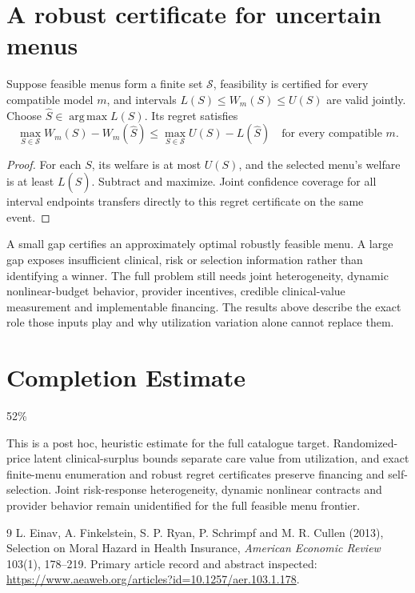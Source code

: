 \documentclass[11pt]{article}
\DeclareMathOperator*{\argmax}{arg\,max}
\begin{document}
\section*{A robust certificate for uncertain menus}
Suppose feasible menus form a finite set $\mathcal S$, feasibility is certified for every compatible model $m$, and intervals $L(S)\leq W_m(S)\leq U(S)$ are valid jointly. Choose $\widehat S\in\argmax L(S)$. Its regret satisfies
\[
 \max_{S\in\mathcal S}W_m(S)-W_m(\widehat S)
 \leq \max_{S\in\mathcal S}U(S)-L(\widehat S)
 \quad\text{for every compatible }m.
\]
\begin{proof}
For each $S$, its welfare is at most $U(S)$, and the selected menu's welfare is at least $L(\widehat S)$. Subtract and maximize. Joint confidence coverage for all interval endpoints transfers directly to this regret certificate on the same event.
\end{proof}

A small gap certifies an approximately optimal robustly feasible menu. A large gap exposes insufficient clinical, risk or selection information rather than identifying a winner. The full problem still needs joint heterogeneity, dynamic nonlinear-budget behavior, provider incentives, credible clinical-value measurement and implementable financing. The results above describe the exact role those inputs play and why utilization variation alone cannot replace them.

\section{Completion Estimate}
52\%

This is a post hoc, heuristic estimate for the full catalogue target.
Randomized-price latent clinical-surplus bounds separate care value from utilization, and exact finite-menu enumeration and robust regret certificates preserve financing and self-selection. Joint risk-response heterogeneity, dynamic nonlinear contracts and provider behavior remain unidentified for the full feasible menu frontier.

\begin{thebibliography}{9}
 L. Einav, A. Finkelstein, S. P. Ryan, P. Schrimpf and M. R. Cullen (2013), Selection on Moral Hazard in Health Insurance, \emph{American Economic Review} 103(1), 178--219. Primary article record and abstract inspected: \url{https://www.aeaweb.org/articles?id=10.1257/aer.103.1.178}.
\end{thebibliography}
\end{document}

